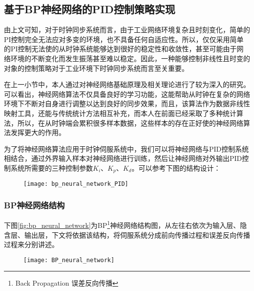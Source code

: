 \subsection{基于BP神经网络的PID控制策略实现}
由上文可知，对于时钟同步系统而言，由于工业网络环境复杂且时刻变化，简单的PI控制完全无法应对多变的环境，也不具备任何自适应性。所以，仅仅采用简单的PI控制无法使的从时钟系统能够达到很好的稳定性和收敛性，甚至可能由于网络环境的不断变化而发生振荡甚至难以稳定。因此，一种能够控制非线性且时变的对象的控制策略对于工业环境下时钟同步系统而言至关重要。

在上一小节中，本人通过对神经网络基础原理及相关理论进行了较为深入的研究。可以看出，神经网络算法不仅具备良好的学习功能，这能帮助从时钟在复杂的网络环境下不断对自身进行调整以达到良好的同步效果，而且，该算法作为数据非线性映射工具，还能与传统统计方法相互补充，而本人在前面已经采取了多种统计算法，所以，在从时钟端会累积很多样本数据，这些样本的存在正好使的神经网络算法发挥更大的作用\supercite{63}。

为了将神经网络算法应用于时钟伺服系统中，我们可以将神经网络与PID控制系统相结合，通过外界输入样本对神经网络进行训练，然后让神经网络对外输出PID控制系统所需要的三种控制参数$K_{i}$、$K_{p}$、$K_{d}$。可以参考下图的结构设计：

\begin{figure}[!hbp]
  \centering
  \begin{minipage}[b]{0.6\textwidth}
    \captionstyle{\centering}
    \centering
    \texttt{[image: bp\_neural\_network\_PID]}
  \end{minipage}     
\end{figure}

\subsubsection{BP神经网络结构}
下图\ref{fig:bp_neural_network}为BP\footnote{Back Propagation 误差反向传播}神经网络结构图，从左往右依次为输入层、隐含层、输出层，下文将依据该结构，将伺服系统分成前向传播过程和误差反向传播过程来分别讲述。
\begin{figure}[!hbp]
  \centering
  \begin{minipage}[b]{0.6\textwidth}
    \captionstyle{\centering}
    \centering
    \texttt{[image: BP\_neural\_network]}
  \end{minipage}     
\end{figure}

